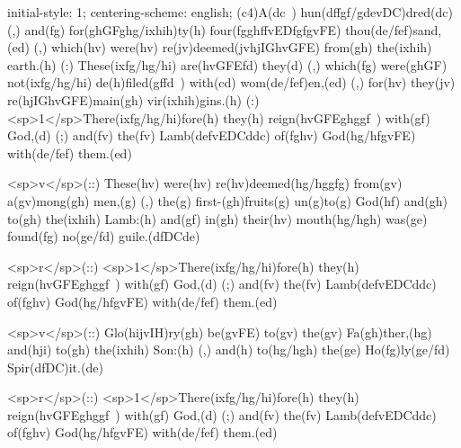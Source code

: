 initial-style: 1;
centering-scheme: english;
(c4)A(dc~) hun(dffgf/gdevDC)dred(dc) (,) and(fg) for(ghGFghg/ixhih)ty(h) four(fgghffvEDfgfgvFE) thou(de/fef)sand,(ed) (,) which(hv) were(hv) re(jv)deemed(jvhjIGhvGFE) from(gh) the(ixhih) earth.(h) (:) These(ixfg/hg/hi) are(hvGFEfd) they(d) (,) which(fg) were(ghGF) not(ixfg/hg/hi) de(h)filed(gffd~) with(cd) wom(de/fef)en,(ed) (,) for(hv) they(jv) re(hjIGhvGFE)main(gh) vir(ixhih)gins.(h) (:) <sp>1</sp>There(ixfg/hg/hi)fore(h) they(h) reign(hvGFEghggf~) with(gf) God,(d) (;) and(fv) the(fv) Lamb(defvEDCddc) of(fghv) God(hg/hfgvFE) with(de/fef) them.(ed)

<sp>v</sp>(::) These(hv) were(hv) re(hv)deemed(hg/hggfg) from(gv) a(gv)mong(gh) men,(g) (,) the(g) first-(gh)fruits(g) un(g)to(g) God(hf) and(gh) to(gh) the(ixhih) Lamb:(h) and(gf) in(gh) their(hv) mouth(hg/hgh) was(ge) found(fg) no(ge/fd) guile.(dfDCde)

<sp>r</sp>(::) <sp>1</sp>There(ixfg/hg/hi)fore(h) they(h) reign(hvGFEghggf~) with(gf) God,(d) (;) and(fv) the(fv) Lamb(defvEDCddc) of(fghv) God(hg/hfgvFE) with(de/fef) them.(ed)

<sp>v</sp>(::) Glo(hijvIH)ry(gh) be(gvFE) to(gv) the(gv) Fa(gh)ther,(hg) and(hji) to(gh) the(ixhih) Son:(h) (,) and(h) to(hg/hgh) the(ge) Ho(fg)ly(ge/fd) Spir(dfDC)it.(de)

<sp>r</sp>(::) <sp>1</sp>There(ixfg/hg/hi)fore(h) they(h) reign(hvGFEghggf~) with(gf) God,(d) (;) and(fv) the(fv) Lamb(defvEDCddc) of(fghv) God(hg/hfgvFE) with(de/fef) them.(ed)